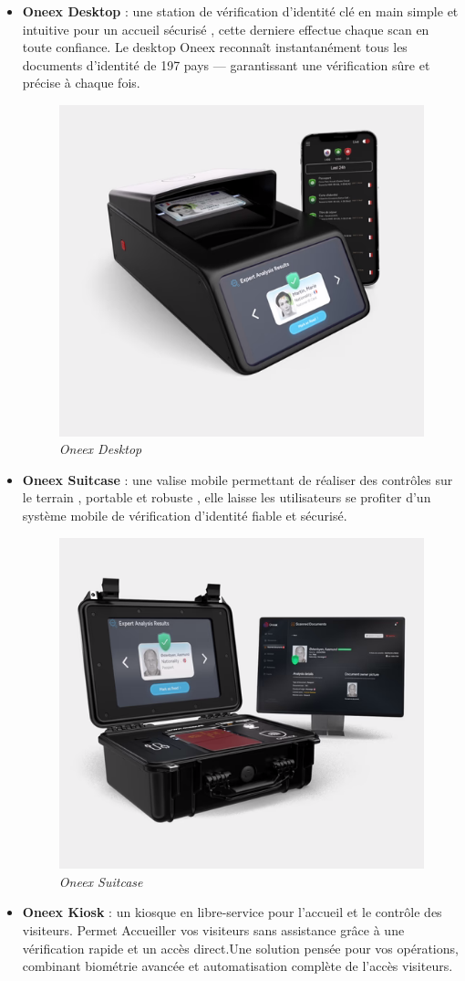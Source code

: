 \begin{itemize}
	\item \textbf{Oneex Desktop} : une station de vérification d’identité clé en main simple et intuitive pour un accueil sécurisé , cette derniere effectue chaque scan en toute confiance. Le desktop Oneex reconnaît instantanément tous les documents d'identité de 197 pays — garantissant une vérification sûre et précise à chaque fois.
	      \begin{figure} [H]
		      \centering
		      \includegraphics[width=.5\textwidth]{figures/Oneex desktop.png}
		      \caption{\textit{Oneex Desktop}}
		      \label{fig:Oneex desktop}
	      \end{figure}
	\item \textbf{Oneex Suitcase} : une valise mobile permettant de réaliser des contrôles sur le terrain , portable et robuste , elle laisse les utilisateurs se profiter d’un système mobile de vérification d’identité fiable et sécurisé.
	      \begin{figure} [H]
		      \centering
		      \includegraphics[width=.5\textwidth]{figures/Oneex suitcase.png}
		      \caption{\textit{Oneex Suitcase}}
		      \label{fig:Oneex Suitcase}
	      \end{figure}
	\item \textbf{Oneex Kiosk} : un kiosque en libre-service pour l’accueil et le contrôle des visiteurs. Permet Accueiller vos visiteurs sans assistance grâce à une vérification rapide et un accès direct.Une solution pensée pour vos opérations, combinant biométrie avancée et automatisation complète de l’accès visiteurs.

\end{itemize}
